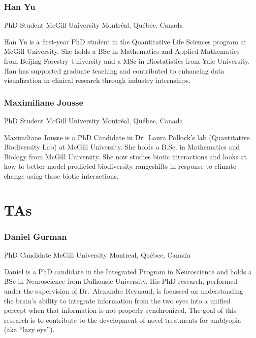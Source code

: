 \documentclass[
]{book}
\begin{document}
\subsubsection{Han Yu}\label{han-yu}

PhD Student
McGill University
Montréal, Québec, Canada

Han Yu is a first-year PhD student in the Quantitative Life Sciences program at McGill University. She holds a BSc in Mathematics and Applied Mathematics from Beijing Forestry University and a MSc in Biostatistics from Yale University. Han has supported graduate teaching and contributed to enhancing data visualization in clinical research through industry internships.

\subsubsection{Maximiliane Jousse}\label{maximiliane-jousse}

PhD Student
McGill University
Montréal, Québec, Canada

Maximiliane Jousse is a PhD Candidate in Dr.~Laura Pollock's lab (Quantitative Biodiversity Lab) at McGill University. She holds a B.Sc. in Mathematics and Biology from McGill University. She now studies biotic interactions and looks at how to better model predicted biodiversity rangeshifts in response to climate change using these biotic interactions.

\section{TAs}\label{tas}

\subsubsection{Daniel Gurman}\label{daniel-gurman}

PhD Candidate
McGill University
Montreal, Québec, Canada

Daniel is a PhD candidate in the Integrated Program in Neuroscience and holds a BSc in Neuroscience from Dalhousie University. His PhD research, performed under the supervision of Dr.~Alexandre Reynaud, is focussed on understanding the brain's ability to integrate information from the two eyes into a unified percept when that information is not properly synchronized. The goal of this research is to contribute to the development of novel treatments for amblyopia (aka ``lazy eye'').
\end{document}
